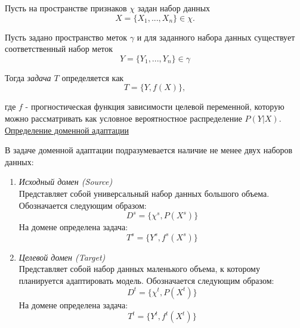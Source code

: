 Пусть на пространстве признаков $\chi$ задан набор данных
\begin{equation}
	X = \{X_1, ..., X_n\} \in \chi.
\end{equation}

Пусть задано пространство меток $\gamma$ и для заданного набора данных существует соответственный набор меток
\begin{equation}
Y = \{Y_1, ..., Y_n\} \in \gamma
\end{equation}

Тогда \textit{задача $T$} определяется как 
\begin{equation}
T = \{Y, f(X)\},
\end{equation}

где $f$ - прогностическая функция зависимости целевой переменной, которую можно рассматривать как условное вероятностное распределение $P(Y|X)$.\\

\underline{Определение доменной адаптации}

В задаче доменной адаптации подразумевается наличие не менее двух наборов данных:
\begin{enumerate}
\item \textit{Исходный домен (Source)}\\
Представляет собой универсальный набор данных большого объема. Обозначается следующим образом:
$$D^s = \{\chi^s, P(X^s)\}$$
На домене определена задача: $$T^s = \{Y^s, f^s(X^s)\}$$
\item \textit{Целевой домен (Target)}\\
Представляет собой набор данных маленького объема, к которому планируется адаптировать модель. Обозначается следующим образом:
$$D^t = \{\chi^t, P(X^t)\}$$
На домене определена задача: $$T^t = \{Y^t, f^t(X^t)\}$$
\end{enumerate}

